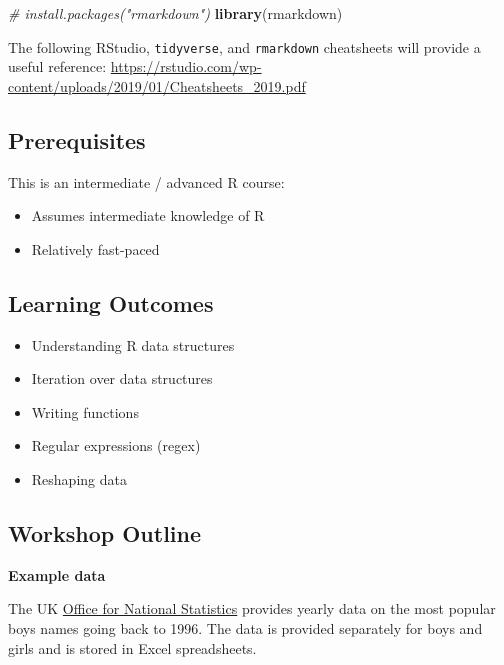 \documentclass[]{book}
\newenvironment{Shaded}{\begin{snugshade}}{\end{snugshade}}
\newcommand{\CommentTok}[1]{\textcolor[rgb]{0.56,0.35,0.01}{\textit{#1}}}
\newcommand{\KeywordTok}[1]{\textcolor[rgb]{0.13,0.29,0.53}{\textbf{#1}}}
\newcommand{\NormalTok}[1]{#1}
\providecommand{\tightlist}{%
  \setlength{\itemsep}{0pt}\setlength{\parskip}{0pt}}
\begin{document}
\begin{Shaded}
\begin{Highlighting}[]
\CommentTok{# install.packages("rmarkdown")}
\KeywordTok{library}\NormalTok{(rmarkdown)}
\end{Highlighting}
\end{Shaded}

The following RStudio, \texttt{tidyverse}, and \texttt{rmarkdown} cheatsheets will provide a
useful reference: \url{https://rstudio.com/wp-content/uploads/2019/01/Cheatsheets_2019.pdf}

\hypertarget{prerequisites-3}{%
\subsection{Prerequisites}\label{prerequisites-3}}

This is an intermediate / advanced R course:

\begin{itemize}
\tightlist
\item
  Assumes intermediate knowledge of R
\item
  Relatively fast-paced
\end{itemize}

\hypertarget{learning-outcomes-3}{%
\subsection{Learning Outcomes}\label{learning-outcomes-3}}

\begin{itemize}
\tightlist
\item
  Understanding R data structures
\item
  Iteration over data structures
\item
  Writing functions
\item
  Regular expressions (regex)
\item
  Reshaping data
\end{itemize}

\hypertarget{workshop-outline-2}{%
\subsection{Workshop Outline}\label{workshop-outline-2}}

\textbf{Example data}

The UK \href{https://www.ons.gov.uk}{Office for National Statistics} provides yearly
data on the most popular boys names going back to 1996. The data is provided
separately for boys and girls and is stored in Excel spreadsheets.
\end{document}
